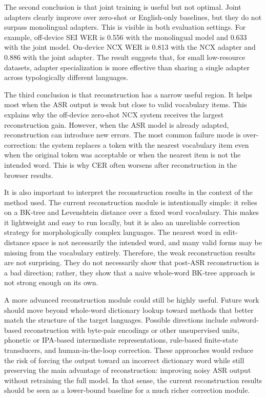 \documentclass[11pt]{article}
\begin{document}
The second conclusion is that joint training is useful but not optimal. Joint adapters clearly improve over zero-shot or English-only baselines, but they do not surpass monolingual adapters. This is visible in both evaluation settings. For example, off-device SEI WER is 0.556 with the monolingual model and 0.633 with the joint model. On-device NCX WER is 0.813 with the NCX adapter and 0.886 with the joint adapter. The result suggests that, for small low-resource datasets, adapter specialization is more effective than sharing a single adapter across typologically different languages.

The third conclusion is that reconstruction has a narrow useful region. It helps most when the ASR output is weak but close to valid vocabulary items. This explains why the off-device zero-shot NCX system receives the largest reconstruction gain. However, when the ASR model is already adapted, reconstruction can introduce new errors. The most common failure mode is over-correction: the system replaces a token with the nearest vocabulary item even when the original token was acceptable or when the nearest item is not the intended word. This is why CER often worsens after reconstruction in the browser results.

It is also important to interpret the reconstruction results in the context of the method used. The current reconstruction module is intentionally simple: it relies on a BK-tree and Levenshtein distance over a fixed word vocabulary. This makes it lightweight and easy to run locally, but it is also an unreliable correction strategy for morphologically complex languages. The nearest word in edit-distance space is not necessarily the intended word, and many valid forms may be missing from the vocabulary entirely. Therefore, the weak reconstruction results are not surprising. They do not necessarily show that post-ASR reconstruction is a bad direction; rather, they show that a naive whole-word BK-tree approach is not strong enough on its own.

A more advanced reconstruction module could still be highly useful. Future work should move beyond whole-word dictionary lookup toward methods that better match the structure of the target languages. Possible directions include subword-based reconstruction with byte-pair encodings or other unsupervised units, phonetic or IPA-based intermediate representations, rule-based finite-state transducers, and human-in-the-loop correction. These approaches would reduce the risk of forcing the output toward an incorrect dictionary word while still preserving the main advantage of reconstruction: improving noisy ASR output without retraining the full model. In that sense, the current reconstruction results should be seen as a lower-bound baseline for a much richer correction module.
\end{document}
